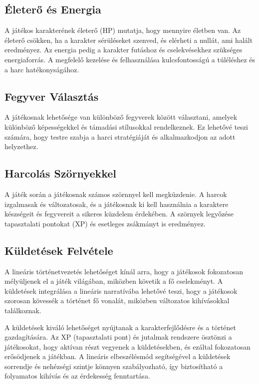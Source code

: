\subsection{Életerő és Energia}

A játékos karakterének életerő (HP) mutatja, hogy mennyire életben van. Az életerő csökken, ha a karakter sérüléseket szenved, és elérheti a nullát, ami halált eredményez. Az energia pedig a karakter futáshoz és cselekvésekhez szükséges energiaforrás. A megfelelő kezelése és felhasználása kulcsfontosságú a túléléshez és a harc hatékonyságához.

\subsection{Fegyver Választás}

A játékosnak lehetősége van különböző fegyverek között választani, amelyek különböző képességekkel és támadási stílusokkal rendelkeznek. Ez lehetővé teszi számára, hogy testre szabja a harci stratégiáját és alkalmazkodjon az adott helyzethez.

\subsection{Harcolás Szörnyekkel}

A játék során a játékosnak számos szörnnyel kell megküzdenie. A harcok izgalmasak és változatosak, és a játékosnak ki kell használnia a karaktere készségeit és fegyvereit a sikeres küzdelem érdekében. A szörnyek legyőzése tapasztalati pontokat (XP) és esetleges zsákmányt is eredményez.

\subsection{Küldetések Felvétele}

A lineáris történetvezetés lehetőséget kínál arra, hogy a játékosok fokozatosan mélyüljenek el a játék világában, miközben követik a fő cselekményt. A küldetések integrálása a lineáris narratívába lehetővé teszi, hogy a játékosok szorosan kövessék a történet fő vonalát, miközben változatos kihívásokkal találkoznak.

A küldetések kiváló lehetőséget nyújtanak a karakterfejlődésre és a történet gazdagítására. Az XP (tapasztalati pont) és jutalmak rendszere ösztönzi a játékosokat, hogy aktívan részt vegyenek a küldetésekben, és ezáltal fokozatosan erősödjenek a játékban. A lineáris elbeszélésmód segítségével a küldetések sorrendje és nehézségi szintje könnyen szabályozható, így biztosítható a folyamatos kihívás és az érdekesség fenntartása.

